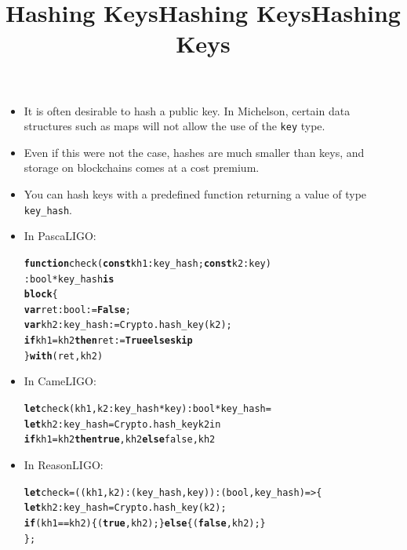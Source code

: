 \documentclass[wide]{slides}
\newcommand{\Kblock}[0]{\textbf{block}\xspace}
\newcommand{\Kconst}[0]{\textbf{const}\xspace}
\newcommand{\Kelse}[0]{\textbf{else}\xspace}
\newcommand{\KFalse}[0]{\textbf{False}\xspace}
\newcommand{\Kfunction}[0]{\textbf{function}\xspace}
\newcommand{\Kif}[0]{\textbf{if}\xspace}
\newcommand{\Kis}[0]{\textbf{is}\xspace}
\newcommand{\Kskip}[0]{\textbf{skip}\xspace}
\newcommand{\Kthen}[0]{\textbf{then}\xspace}
\newcommand{\KTrue}[0]{\textbf{True}\xspace}
\newcommand{\Kvar}[0]{\textbf{var}\xspace}
\newcommand{\Kwith}[0]{\textbf{with}\xspace}
\newcommand{\Kfalse}[0]{\textbf{false}\xspace}
\newcommand{\Klet}[0]{\textbf{let}\xspace}
\newcommand{\Ktrue}[0]{\textbf{true}\xspace}
\begin{document}
\begin{slide}
  \title{Hashing Keys}

  \begin{itemize}

    \item It is often desirable to hash a public key. In Michelson,
      certain data structures such as maps will not allow the use of
      the \texttt{key} type.

    \item Even if this were not the case, hashes are much smaller than
      keys, and storage on blockchains comes at a cost premium.

    \item You can hash keys with a predefined function returning a
      value of type \texttt{key\_hash}.

  \end{itemize}

\end{slide}

\begin{slide}
  \title{Hashing Keys}

  \begin{itemize}

    \item In PascaLIGO:
      \begin{alltt}
\Kfunction check (\Kconst kh1 : key_hash; \Kconst k2 : key)
  : bool * key_hash \Kis
  \Kblock \{
    \Kvar ret : bool := \KFalse;
    \Kvar kh2 : key_hash := Crypto.hash_key (k2);
    \Kif kh1 = kh2 \Kthen ret := \KTrue \Kelse \Kskip
  \} \Kwith (ret, kh2)
      \end{alltt}

  \end{itemize}

\end{slide}

\begin{slide}
  \title{Hashing Keys}

  \begin{itemize}

    \item In CameLIGO:
      \begin{alltt}
\Klet check (kh1, k2 : key_hash * key) : bool * key_hash =
  \Klet kh2 : key_hash = Crypto.hash_key k2 in
  \Kif kh1 = kh2 \Kthen \Ktrue, kh2 \Kelse false, kh2
      \end{alltt}

    \item In ReasonLIGO:
      \begin{alltt}
\Klet check = ((kh1, k2) : (key_hash, key)) : (bool, key_hash) => \{
  \Klet kh2 : key_hash = Crypto.hash_key (k2);
  \Kif (kh1 == kh2) \{ (\Ktrue, kh2); \} \Kelse \{ (\Kfalse, kh2); \}
\};
      \end{alltt}

  \end{itemize}

\end{slide}
\end{document}
